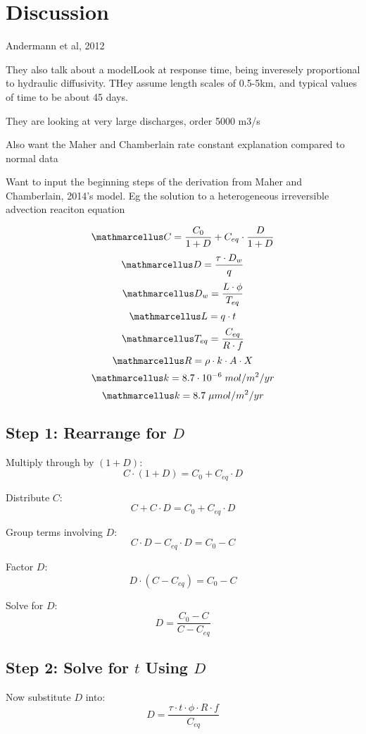

\section{Discussion}




Andermann et al, 2012

They also talk about a modelLook at response time, being inveresely proportional to hydraulic diffusivity.
THey assume length scales of 0.5-5km, and typical values of time to be about 45 days.

They are looking at very large discharges, order 5000 m3/s




\bsk

Also want the Maher and Chamberlain rate constant explanation compared to normal data

\bsk

Want to input the beginning steps of the derivation from Maher and Chamberlain, 2014's model. Eg the solution to a heterogeneous irreversible advection reaciton equation



\bsk
\[
\ttmath{C = \frac{C_0}{1 + D} + C_{eq} \cdot \frac{D}{1 + D}}
\]
\[
\ttmath{D = \frac{\tau \cdot D_w}{q}}
\]
\[
\ttmath{D_w = \frac{L \cdot \phi}{T_{eq}}}
\]
\[
\ttmath{L = q \cdot t}
\]
\[
\ttmath{T_{eq} = \frac{C_{eq}}{R \cdot f}}
\]
\[
\ttmath{R = \rho \cdot k \cdot A \cdot X}
\]
\[
\ttmath{k = 8.7 \cdot 10^{-6}  \; mol/m^2/yr}
\]
\[
\ttmath{k = 8.7 \; \mu mol/m^2/yr}
\]
\subsection{Step 1: Rearrange for $D$}
Multiply through by $(1 + D)$:
\[
C \cdot (1 + D) = C_0 + C_{eq} \cdot D
\]

Distribute $C$:
\[
C + C \cdot D = C_0 + C_{eq} \cdot D
\]

Group terms involving $D$:
\[
C \cdot D - C_{eq} \cdot D = C_0 - C
\]

Factor $D$:
\[
D \cdot (C - C_{eq}) = C_0 - C
\]

Solve for $D$:
\[
D = \frac{C_0 - C}{C - C_{eq}}
\]

\subsection{Step 2: Solve for $t$ Using $D$}
Now substitute $D$ into:
\[
D = \frac{\tau \cdot t \cdot \phi \cdot R \cdot f}{C_{eq}}
\]


